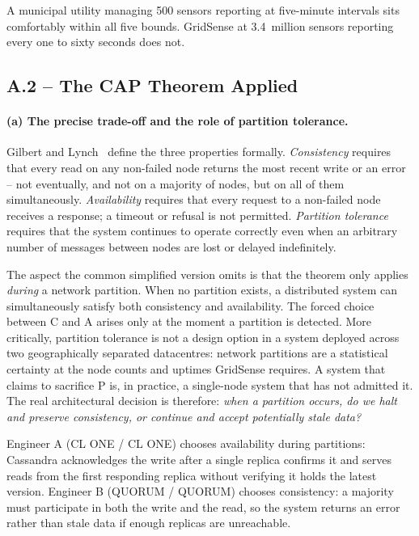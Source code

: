 \documentclass[11pt, a4paper]{article}
\makeatletter
\renewcommand{\_}{\origunderscore\penalty\z@\hskip\z@skip}
\renewcommand{\{}{\origlbrace\penalty\z@\hskip\z@skip}
\renewcommand{\}}{\origrbrace\penalty\z@\hskip\z@skip}
\makeatother
\begin{document}
A municipal utility managing 500 sensors reporting at five-minute
intervals sits comfortably within all five bounds. GridSense at
3.4~million sensors reporting every one to sixty seconds does not.

\subsection{A.2 -- The CAP Theorem Applied}

\paragraph{(a) The precise trade-off and the role of partition tolerance.}
Gilbert and Lynch~\cite{gilbert2002} define the three properties
formally. \emph{Consistency} requires that every read on any non-failed
node returns the most recent write or an error -- not eventually, and
not on a majority of nodes, but on all of them simultaneously.
\emph{Availability} requires that every request to a non-failed node
receives a response; a timeout or refusal is not permitted.
\emph{Partition tolerance} requires that the system continues to operate
correctly even when an arbitrary number of messages between nodes are
lost or delayed indefinitely.

The aspect the common simplified version omits is that the theorem only
applies \emph{during} a network partition. When no partition exists, a
distributed system can simultaneously satisfy both consistency and
availability. The forced choice between C and A arises only at the
moment a partition is detected. More critically, partition tolerance is
not a design option in a system deployed across two geographically
separated datacentres: network partitions are a statistical certainty at
the node counts and uptimes GridSense requires. A system that claims to
sacrifice P is, in practice, a single-node system that has not admitted
it. The real architectural decision is therefore: \emph{when a partition
occurs, do we halt and preserve consistency, or continue and accept
potentially stale data?}

Engineer A (CL ONE / CL ONE) chooses availability during partitions:
Cassandra acknowledges the write after a single replica confirms it and
serves reads from the first responding replica without verifying it
holds the latest version. Engineer B (QUORUM / QUORUM) chooses
consistency: a majority must participate in both the write and the read,
so the system returns an error rather than stale data if enough replicas
are unreachable.
\end{document}
